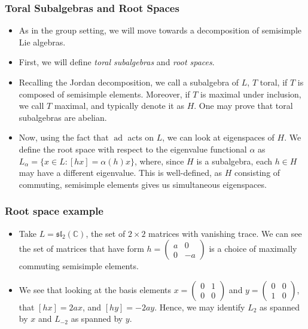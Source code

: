 \documentclass{beamer}
\theoremstyle{remark}
\begin{document}
\begin{frame}
\frametitle{Toral Subalgebras and Root Spaces}
\begin{itemize}
\item As in the group setting, we will move towards a decomposition of semisimple Lie algebras.
\pause
\item First, we will define \emph{toral subalgebras} and \emph{root spaces}.
\pause
\item Recalling the Jordan decomposition, we call a subalgebra of $L$, $T$ toral, if $T$ is composed of semisimple elements. Moreover, if $T$ is maximal under inclusion, we call $T$ maximal, and typically denote it as $H$. One may prove that toral subalgebras are abelian.
\pause
\item Now, using the fact that  $\operatorname{ad}$ acts on $L$, we can look at eigenspaces of $H$. We define the root space with respect to the eigenvalue functional $\alpha$ as $L_\alpha = \{ x \in L : [hx] = \alpha(h) x \}$, where, since $H$ is a subalgebra, each $h \in H$ may have a different eigenvalue. This is well-defined, as $H$ consisting of commuting, semisimple elements gives us simultaneous eigenspaces.
\end{itemize}
\end{frame}

\begin{frame}
\frametitle{Root space example}
\begin{itemize}
\item Take $L = \mathfrak{sl}_2(\mathbb{C})$, the set of $2 \times 2$ matrices with vanishing trace. We can see the set of matrices that have form $h = \begin{pmatrix} a & 0 \\ 0 & -a \end{pmatrix}$ is a choice of maximally commuting semisimple elements.
\pause
\item We see that looking at the basis elements $x = \begin{pmatrix} 0 & 1 \\ 0 & 0 \end{pmatrix}$ and $y = \begin{pmatrix} 0 & 0 \\ 1 & 0 \end{pmatrix}$, that $[hx] = 2ax$, and $[hy] = -2ay$. Hence, we may identify $L_2$ as spanned by $x$ and $L_{-2}$ as spanned by $y$. 
\end{itemize}
\end{frame}
\end{document}
